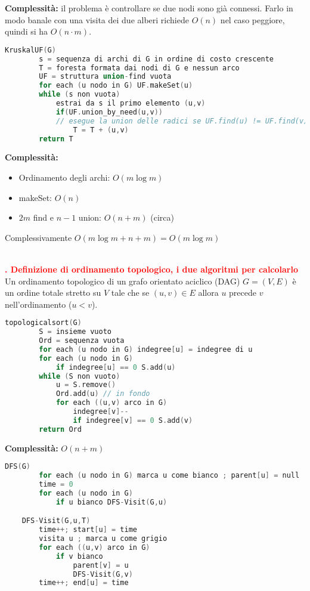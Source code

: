 \documentclass[12pt]{article}
\newcounter{questioncounter}
\newcommand{\question}[1]{
    \stepcounter{questioncounter}
    \textbf{\\\textcolor{red}{\arabic{questioncounter}. #1}}\\
}
\begin{document}
\textbf{Complessità:} il problema è controllare se due nodi sono già connessi. Farlo in modo banale con una visita dei due alberi richiede $O(n)$ nel caso peggiore, quindi si ha $O(n\cdot m)$.
\begin{lstlisting}[language=C]
    KruskalUF(G)
        s = sequenza di archi di G in ordine di costo crescente
        T = foresta formata dai nodi di G e nessun arco
        UF = struttura union-find vuota
        for each (u nodo in G) UF.makeSet(u)
        while (s non vuota)
            estrai da s il primo elemento (u,v)
            if(UF.union_by_need(u,v)) 
            // esegue la union delle radici se UF.find(u) != UF.find(v)
                T = T + (u,v)
        return T
\end{lstlisting}
\textbf{Complessità:}
\begin{itemize}
    \item Ordinamento degli archi: $O(m\log m)$
    \item makeSet: $O(n)$
    \item $2m$ find e $n-1$ union: $O(n+m)$ (circa)
\end{itemize}
Complessivamente $O(m\log m + n+m)=O(m\log m)$
\question{Definizione di ordinamento topologico, i due algoritmi per calcolarlo}
Un ordinamento topologico di un grafo orientato aciclico (DAG) $G=(V,E)$ è un ordine totale stretto su $V$ tale che se $(u,v) \in E$ allora $u$ precede $v$ nell'ordinamento ($u<v$).
\begin{lstlisting}[language=C]
    topologicalsort(G)
        S = insieme vuoto
        Ord = sequenza vuota
        for each (u nodo in G) indegree[u] = indegree di u
        for each (u nodo in G)
            if indegree[u] == 0 S.add(u)
        while (S non vuoto)
            u = S.remove()
            Ord.add(u) // in fondo
            for each ((u,v) arco in G)
                indegree[v]--
                if indegree[v] == 0 S.add(v)
        return Ord
\end{lstlisting}
\textbf{Complessità:} $O(n+m)$
\begin{lstlisting}[language=C]
    DFS(G)
        for each (u nodo in G) marca u come bianco ; parent[u] = null
        time = 0
        for each (u nodo in G)
            if u bianco DFS-Visit(G,u)

    DFS-Visit(G,u,T)
        time++; start[u] = time
        visita u ; marca u come grigio
        for each ((u,v) arco in G)
            if v bianco
                parent[v] = u
                DFS-Visit(G,v)
        time++; end[u] = time
\end{lstlisting}
\end{document}
